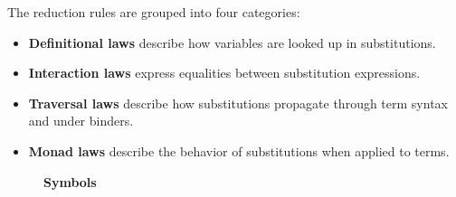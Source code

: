 \documentclass[screen,nonacm]{acmart}
\begin{document}
The reduction rules are grouped into four categories:
\begin{itemize}
      \item \textbf{Definitional laws} describe how variables are looked up in substitutions.
      \item \textbf{Interaction laws} express equalities between substitution expressions.
      \item \textbf{Traversal laws} describe how substitutions propagate through term syntax and under binders.
      \item \textbf{Monad laws} describe the behavior of substitutions when applied to terms.
\end{itemize}

\begin{figure}[t]
      \centering
      \small
      {\raggedright \textbf{\Large Symbols} \par}
      \vspace{1.5em}


\end{figure}
\end{document}
